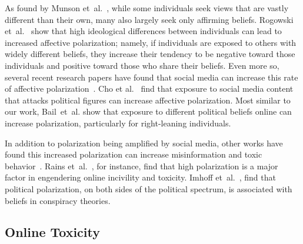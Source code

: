 As found by  Munson et~al.~\cite{munson2010presenting}, while some individuals seek views that are vastly different than their own, many also largely seek only affirming beliefs. Rogowski  et~al.~\cite{rogowski2016ideology} show that high ideological differences between individuals can lead to increased affective polarization; namely, if individuals are exposed to others with widely different beliefs, they increase their tendency to be negative toward those individuals and positive toward those who share their beliefs. Even more so, several recent research papers have found that social media can increase this rate of affective polarization~\cite{suhay2018polarizing,kubin2021role}. Cho et al.~\cite{cho2020search} find that exposure to social media content that attacks political figures can increase affective polarization. Most similar to our work, Bail~et~al.\cite{bail2018exposure} show that exposure to different political beliefs online can increase polarization, particularly for right-leaning individuals. 

In addition to polarization being amplified by social media, other works have found this increased polarization can increase misinformation and toxic behavior~\cite{an2014partisan}. Rains {et~al.}~\cite{rains2017incivility}, for instance, find that high polarization is a major factor in engendering online incivility and toxicity. Imhoff {et~al.}~\cite{imhoff2022conspiracy}, find that political polarization, on both sides of the political spectrum, is associated with beliefs in conspiracy theories. 

\subsection{Online Toxicity}

